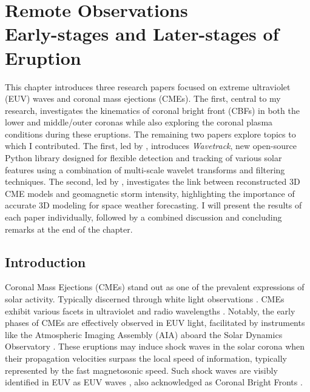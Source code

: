 \chapter[Remote Observations: Early-stages and Later-stages of Eruption]{Remote Observations\\\LARGE Early-stages and Later-stages of Eruption}
\label{chapter2}
This chapter introduces three research papers focused on extreme ultraviolet (EUV) waves and coronal mass ejections (CMEs). The first, central to my research, investigates the kinematics of coronal bright front (CBFs) in both the lower and middle/outer coronas while also exploring the coronal plasma conditions during these eruptions.
The remaining two papers explore topics to which I contributed. The first, led by \citet{stepanyuk_2022}, introduces \textit{Wavetrack}, new open-source Python library designed for flexible detection and tracking of various solar features using a combination of multi-scale wavelet transforms and filtering techniques. The second, led by \citet{miteva_2023}, investigates the link between reconstructed 3D CME models and geomagnetic storm intensity, highlighting the importance of accurate 3D modeling for space weather forecasting.
I will present the results of each paper individually, followed by a combined discussion and concluding remarks at the end of the chapter.


\section{Introduction}
Coronal Mass Ejections (CMEs) stand out as one of the prevalent expressions of solar activity. Typically discerned through white light observations \citep{vourlidas_2003, zhang_2006, bein_2011}. CMEs exhibit various facets in ultraviolet and radio wavelengths \citep{bastian_2001, veronig_2010}. Notably, the early phases of CMEs are effectively observed in EUV light, facilitated by instruments like the Atmospheric Imaging Assembly (AIA) aboard the Solar Dynamics Observatory \citep[SDO]{lemen_2011, pesnell_2012}. These eruptions may induce shock waves in the solar corona when their propagation velocities surpass the local speed of information, typically represented by the fast magnetosonic speed. Such shock waves are visibly identified in EUV as EUV waves \citep{thompson_1998}, also acknowledged as Coronal Bright Fronts \citep[CBFs]{long_2011}.

